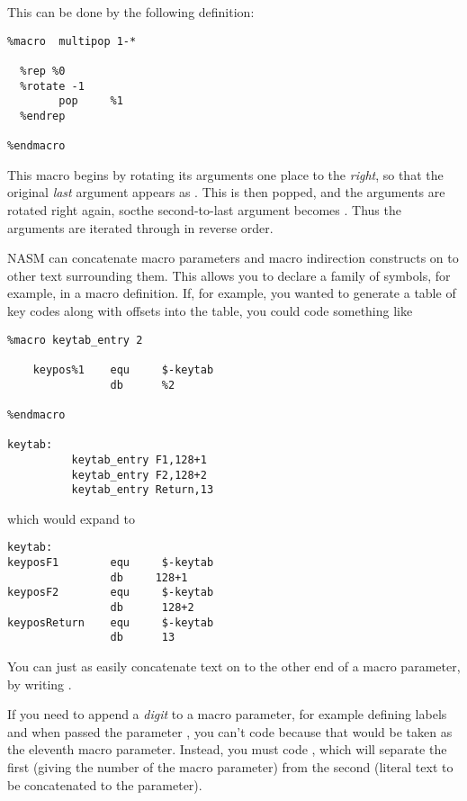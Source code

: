 This can be done by the following definition:

\begin{lstlisting}
%macro  multipop 1-*

  %rep %0
  %rotate -1
        pop     %1
  %endrep

%endmacro
\end{lstlisting}

This macro begins by rotating its arguments one place to the
\emph{right}, so that the original \emph{last} argument appears
as . This is then popped, and the arguments are rotated
right again, socthe second-to-last argument becomes .
Thus the arguments are iterated through in reverse order.


NASM can concatenate macro parameters and macro indirection constructs
on to other text surrounding them. This allows you to declare a family
of symbols, for example, in a macro definition. If, for example, you
wanted to generate a table of key codes along with offsets into the
table, you could code something like

\begin{lstlisting}
%macro keytab_entry 2

    keypos%1    equ     $-keytab
                db      %2

%endmacro

keytab:
          keytab_entry F1,128+1
          keytab_entry F2,128+2
          keytab_entry Return,13
\end{lstlisting}

which would expand to

\begin{lstlisting}
keytab:
keyposF1        equ     $-keytab
                db     128+1
keyposF2        equ     $-keytab
                db      128+2
keyposReturn    equ     $-keytab
                db      13
\end{lstlisting}

You can just as easily concatenate text on to the other end of a
macro parameter, by writing .

If you need to append a \emph{digit} to a macro parameter, for example
defining labels  and  when passed the parameter
, you can't code  because that would be taken as the
eleventh macro parameter. Instead, you must code
, which will separate the first
 (giving the number of the macro parameter) from the second
(literal text to be concatenated to the parameter).

